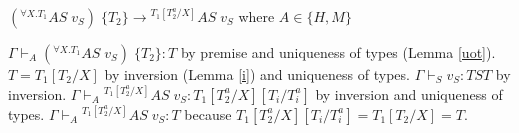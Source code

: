 \begin{case}
$(^{\forall X.T_{1}}AS\;v_{S})\;\lbrace T_{2}\rbrace\rightarrow{^{T_{1}[T_{2}^{a}/X]}A}S\;v_{S}$ where $A\in\lbrace H,M\rbrace$

$\Gamma\vdash_{A}(^{\forall X.T_{1}}AS\;v_{S})\;\lbrace T_{2}\rbrace:T$ by premise and uniqueness of types (Lemma \ref{uot}).  $T=T_{1}[T_{2}/X]$ by inversion (Lemma \ref{i}) and uniqueness of types.  $\Gamma\vdash_{S}v_{S}:TST$ by inversion.  $\Gamma\vdash_{A}{^{T_{1}[T_{2}^{a}/X]}A}S\;v_{S}:T_{1}[T_{2}^{a}/X][T_{i}/T_{i}^{a}]$ by inversion and uniqueness of types.  $\Gamma\vdash_{A}{^{T_{1}[T_{2}^{a}/X]}A}S\;v_{S}:T$ because $T_{1}[T_{2}^{a}/X][T_{i}/T_{i}^{a}]=T_{1}[T_{2}/X]=T$.
\end{case}